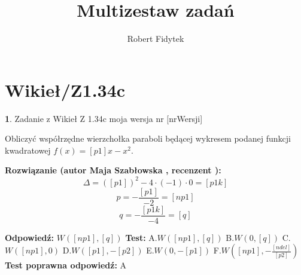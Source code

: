 \documentclass[12pt, a4paper]{article}
\title{Multizestaw zadań}
\author{Robert Fidytek}
\date{}
\theoremstyle{definition} %
\newtheorem{zad}{}
\newcommand{\kategoria}[1]{\section{#1}} %
\newcommand{\zadStart}[1]{\begin{zad}#1\newline} %
\newcommand{\zadStop}{\end{zad}}   %
\newcommand{\rozwStart}[2]{\noindent \textbf{Rozwiązanie (autor #1 , recenzent #2): }\newline} %
\newcommand{\rozwStop}{\newline}                                            %
\newcommand{\odpStart}{\noindent \textbf{Odpowiedź:}\newline}    %
\newcommand{\odpStop}{\newline}                                             %
\newcommand{\testStart}{\noindent \textbf{Test:}\newline} %
\newcommand{\testStop}{\newline} %
\newcommand{\kluczStart}{\noindent \textbf{Test poprawna odpowiedź:}\newline} %
\newcommand{\kluczStop}{\newline} %
\begin{document}
\maketitle


\kategoria{Wikieł/Z1.34c}
\zadStart{Zadanie z Wikieł Z 1.34c moja wersja nr [nrWersji]}


Obliczyć współrzędne wierzchołka paraboli będącej wykresem podanej funkcji kwadratowej $f(x)=[p1]x-x^{2}.$
\zadStop

\rozwStart{Maja Szabłowska}{}
$$\Delta=([p1])^{2}-4\cdot(-1)\cdot0=[p1k]$$
$$p=-\frac{[p1]}{-2}=[np1]$$
$$q=-\frac{[p1k]}{-4}=[q]$$
\rozwStop


\odpStart
$W([np1],[q])$
\odpStop
\testStart
A.$W([np1],[q])$
B.$W(0,[q])$
C.$W([np1],0)$
D.$W([p1],-[p2])$
E.$W(0,-[p1])$
F.$W([np1],-\frac{[ndel]}{[p2]})$
\testStop
\kluczStart
A
\kluczStop
\end{document}

